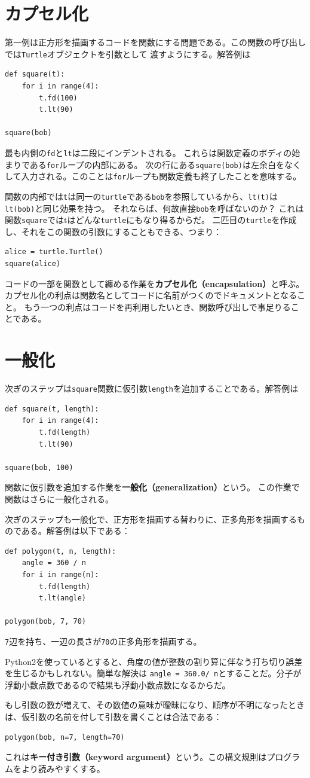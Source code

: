 \documentclass[a4j,12pt,makeidx]{jbook}
\begin{document}
\section{カプセル化}
第一例は正方形を描画するコードを関数にする問題である。この関数の呼び出しでは{\tt Turtle}オブジェクトを引数として
渡すようにする。解答例は
\begin{verbatim}
def square(t):
    for i in range(4):
        t.fd(100)
        t.lt(90)

square(bob)
\end{verbatim}
%
最も内側の{\tt fd}と{\tt lt}は二段にインデントされる。
これらは関数定義のボディの始まりである{\tt for}ループの内部にある。
次の行にある{\tt square(bob)}は左余白をなくして入力される。このことは{\tt for}ループも関数定義も終了したことを意味する。\par
関数の内部では{\tt t}は同一の{\tt turtle}である{\tt bob}を参照しているから、{\tt lt(t)}は{\tt lt(bob)}と同じ効果を持つ。
それならば、何故直接{\tt bob}を呼ばないのか？
これは関数{\tt square}ではtはどんな{\tt turtle}にもなり得るからだ。
二匹目の{\tt turtle}を作成し、それをこの関数の引数にすることもできる、つまり：
\begin{verbatim}
alice = turtle.Turtle()
square(alice)
\end{verbatim}
コードの一部を関数として纏める作業を{\bf カプセル化（encapsulation）}と呼ぶ。
カプセル化の利点は関数名としてコードに名前がつくのでドキュメントとなること。
もう一つの利点はコードを再利用したいとき、関数呼び出しで事足りることである。
%
\section{一般化}
次ぎのステップは{\tt square}関数に仮引数{\tt length}を追加することである。解答例は
\begin{verbatim}
def square(t, length):
    for i in range(4):
        t.fd(length)
        t.lt(90)

square(bob, 100)
\end{verbatim}
関数に仮引数を追加する作業を{\bf 一般化（generalization）}という。 この作業で関数はさらに一般化される。\par
次ぎのステップも一般化で、正方形を描画する替わりに、正多角形を描画するものである。解答例は以下である：
\begin{verbatim}
def polygon(t, n, length):
    angle = 360 / n
    for i in range(n):
        t.fd(length)
        t.lt(angle)

polygon(bob, 7, 70)
\end{verbatim}
{\tt 7}辺を持ち、一辺の長さが{\tt 70}の正多角形を描画する。\par
Python2を使っているとすると、角度の値が整数の割り算に伴なう打ち切り誤差を生じるかもしれない。簡単な解決は
{\tt  angle = 360.0/ n}とすることだ。分子が浮動小数点数であるので結果も浮動小数点数になるからだ。\par
もし引数の数が増えて、その数値の意味が曖昧になり、順序が不明になったときは、仮引数の名前を付して引数を書くことは合法である：
\begin{verbatim}
polygon(bob, n=7, length=70)
\end{verbatim}
これは{\bf キー付き引数（keyword argument）}という。この構文規則はプログラムをより読みやすくする。
%
\end{document}
